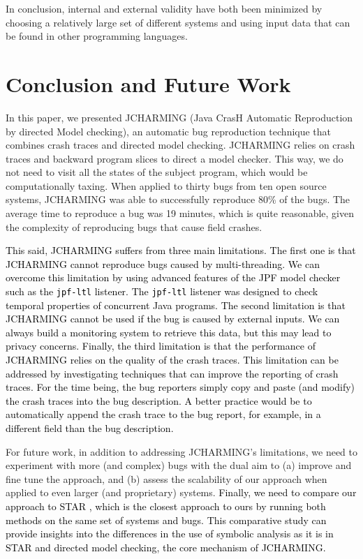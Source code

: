 \documentclass[times, doublespace]{smrauth}
\newcommand{\red}[1]{\textcolor{black}{#1}}
\begin{document}
In conclusion, internal and external validity have both been
minimized by choosing a relatively large set of different
systems and using input data that can be found in other
programming languages.

\section{Conclusion and Future Work\label{sec:conclusion}}

In this paper, we presented JCHARMING (Java CrasH Automatic
Reproduction by directed Model checking), an automatic bug
reproduction technique that combines crash traces and
directed model checking. JCHARMING relies on crash traces and backward program slices to direct a model checker. This way, we do not need to visit all the states of the subject program, which would be computationally taxing.  When applied to thirty bugs from ten open source systems, JCHARMING was able to successfully reproduce 80\% of the bugs. The average time to reproduce a bug was 19 minutes, which is quite reasonable, given the complexity of reproducing bugs that cause field crashes.

\red {This said, JCHARMING suffers from three main limitations. The first one is that JCHARMING cannot reproduce bugs caused by multi-threading. We can overcome this limitation by using advanced features of the JPF model checker such as the \texttt{jpf-ltl} listener. The \texttt{jpf-ltl} listener was designed to check temporal properties of concurrent Java programs. The second limitation is that JCHARMING cannot be used if the bug is caused by external inputs. We can always build a monitoring system to retrieve this data, but this may lead to privacy concerns. Finally, the third limitation is that the performance of JCHARMING relies on the quality of the crash traces. This limitation can be addressed by investigating techniques that can improve the reporting of crash traces. For the time being, the bug reporters simply copy and paste (and modify) the crash traces into the bug description. A better practice would be to automatically append the crash trace to the bug report, for example, in a different field than the bug description.}

For future work, in addition to addressing JCHARMING's limitations, we need to experiment with
more (and complex) bugs with the dual aim to (a) improve and
fine tune the approach, and (b) assess the scalability of our
approach when applied to even larger (and proprietary)
systems.  \red{Finally, we need to compare our approach to STAR \cite{Chen2013a}, which is the closest approach to ours by running both methods on the same set of systems and bugs. This comparative study can provide insights into the differences in the use of symbolic analysis as it is in STAR and directed model checking, the core mechanism of JCHARMING.}

\newpage



\end{document}
